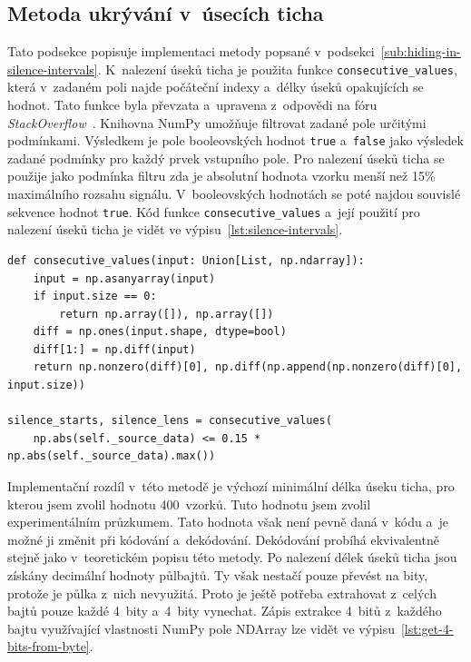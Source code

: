 \subsection*{Metoda ukrývání v~úsecích ticha}
\label{sub:hiding-in-silence-intervals-implementation}

Tato podsekce popisuje implementaci metody popsané
v~podsekci~\ref{sub:hiding-in-silence-intervals}. K~nalezení úseků ticha je
použita funkce \texttt{consecutive\_values}, která v~zadaném poli najde
počáteční indexy a~délky úseků opakujících se hodnot. Tato funkce byla převzata
a~upravena z~odpovědi na fóru
\textit{StackOverflow}~\cite{ConsecutiveValuesStackOverflow}. Knihovna NumPy
umožňuje filtrovat zadané pole určitými podmínkami. Výsledkem je pole
booleovských hodnot \texttt{true} a~\texttt{false} jako výsledek zadané
podmínky pro každý prvek vstupního pole. Pro nalezení úseků ticha se použije
jako podmínka filtru zda je absolutní hodnota vzorku menší než 15\% maximálního
rozsahu signálu. V~booleovských hodnotách se poté najdou souvislé sekvence
hodnot \texttt{true}. Kód funkce \texttt{consecutive\_values} a~její použití
pro nalezení úseků ticha je vidět ve výpisu~\ref{lst:silence-intervals}.

\begin{lstlisting}[language=PythonPlus, label={lst:silence-intervals},
caption={Nalezení indexů a~délek úseků ticha.}]
def consecutive_values(input: Union[List, np.ndarray]):
    input = np.asanyarray(input)
    if input.size == 0:
        return np.array([]), np.array([])
    diff = np.ones(input.shape, dtype=bool)
    diff[1:] = np.diff(input)
    return np.nonzero(diff)[0], np.diff(np.append(np.nonzero(diff)[0], input.size))

silence_starts, silence_lens = consecutive_values(
    np.abs(self._source_data) <= 0.15 * np.abs(self._source_data).max())
\end{lstlisting}

Implementační rozdíl v~této metodě je výchozí minimální délka úseku ticha, pro
kterou jsem zvolil hodnotu 400~vzorků. Tuto hodnotu jsem zvolil experimentálním
průzkumem. Tato hodnota však není pevně daná v~kódu a~je možné ji změnit při
kódování a~dekódování. Dekódování probíhá ekvivalentně stejně jako
v~teoretickém popisu této metody. Po nalezení délek úseků ticha jsou získány
decimální hodnoty půlbajtů. Ty však nestačí pouze převést na bity, protože je
půlka z~nich nevyužitá. Proto je ještě potřeba extrahovat z~celých bajtů pouze
každé 4~bity a~4~bity vynechat. Zápis extrakce 4~bitů z~každého bajtu
využívající vlastnosti NumPy pole NDArray lze vidět ve
výpisu~\ref{lst:get-4-bits-from-byte}.

